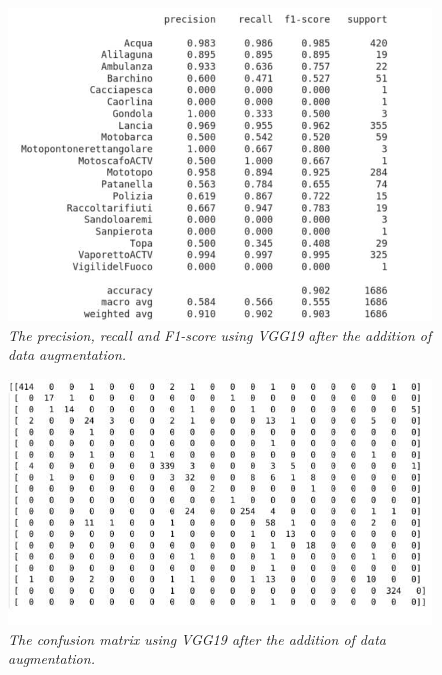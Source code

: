 \documentclass[12pt,a4paper]{report}
\begin{document}
\begin{figure}[H]
\centering
\includegraphics[scale=0.7]{./immagini/vgg19/2_data_augmentation_-_30_epochs_no_stopping_-_dropout_0p5_-_no_batch_norm/f1.JPEG}
\caption{\textit{The precision, recall and F1-score using VGG19 after the addition of data augmentation.}}
\end{figure}
\begin{figure}[H]
\centering
\includegraphics[scale=0.8]{./immagini/vgg19/2_data_augmentation_-_30_epochs_no_stopping_-_dropout_0p5_-_no_batch_norm/cm_num.JPEG}
\caption{\textit{The confusion matrix using VGG19 after the addition of data augmentation.}}
\end{figure}
\end{document}
